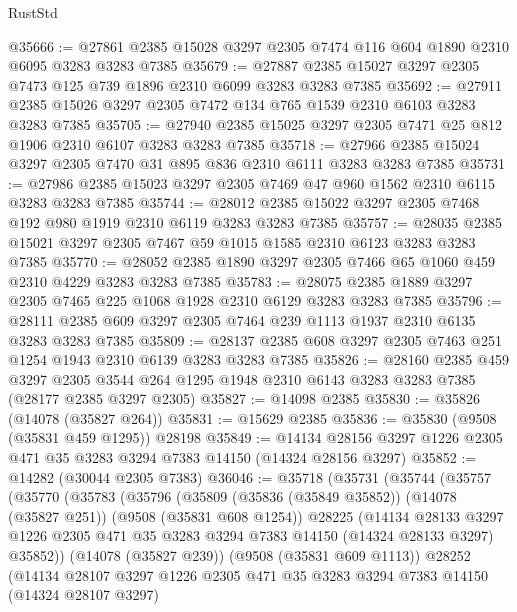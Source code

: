\begin{lexlean}{RustStd}
\begin{coremodule}
@35666 := @27861 @2385 @15028 @3297 @2305 @7474 @116 @604 @1890 @2310 @6095 @3283 @3283 @7385
@35679 := @27887 @2385 @15027 @3297 @2305 @7473 @125 @739 @1896 @2310 @6099 @3283 @3283 @7385
@35692 := @27911 @2385 @15026 @3297 @2305 @7472 @134 @765 @1539 @2310 @6103 @3283 @3283 @7385
@35705 := @27940 @2385 @15025 @3297 @2305 @7471 @25 @812 @1906 @2310 @6107 @3283 @3283 @7385
@35718 := @27966 @2385 @15024 @3297 @2305 @7470 @31 @895 @836 @2310 @6111 @3283 @3283 @7385
@35731 := @27986 @2385 @15023 @3297 @2305 @7469 @47 @960 @1562 @2310 @6115 @3283 @3283 @7385
@35744 := @28012 @2385 @15022 @3297 @2305 @7468 @192 @980 @1919 @2310 @6119 @3283 @3283 @7385
@35757 := @28035 @2385 @15021 @3297 @2305 @7467 @59 @1015 @1585 @2310 @6123 @3283 @3283 @7385
@35770 := @28052 @2385 @1890 @3297 @2305 @7466 @65 @1060 @459 @2310 @4229 @3283 @3283 @7385
@35783 := @28075 @2385 @1889 @3297 @2305 @7465 @225 @1068 @1928 @2310 @6129 @3283 @3283 @7385
@35796 := @28111 @2385 @609 @3297 @2305 @7464 @239 @1113 @1937 @2310 @6135 @3283 @3283 @7385
@35809 := @28137 @2385 @608 @3297 @2305 @7463 @251 @1254 @1943 @2310 @6139 @3283 @3283 @7385
@35826 := @28160
    @2385
    @459
    @3297
    @2305
    @3544
    @264
    @1295
    @1948
    @2310
    @6143
    @3283
    @3283
    @7385
    (@28177 @2385 @3297 @2305)
@35827 := @14098 @2385
@35830 := @35826 (@14078 (@35827 @264))
@35831 := @15629 @2385
@35836 := @35830 (@9508 (@35831 @459 @1295)) @28198
@35849 := @14134 @28156 @3297 @1226 @2305 @471 @35 @3283 @3294 @7383 @14150 (@14324 @28156 @3297)
@35852 := @14282 (@30044 @2305 @7383)
@36046 := @35718
    (@35731
      (@35744
        (@35757
          (@35770
            (@35783
              (@35796
                (@35809
                  (@35836 (@35849 @35852))
                  (@14078 (@35827 @251))
                  (@9508 (@35831 @608 @1254))
                  @28225
                  (@14134
                    @28133
                    @3297
                    @1226
                    @2305
                    @471
                    @35
                    @3283
                    @3294
                    @7383
                    @14150
                    (@14324 @28133 @3297)
                    @35852))
                (@14078 (@35827 @239))
                (@9508 (@35831 @609 @1113))
                @28252
                (@14134
                  @28107
                  @3297
                  @1226
                  @2305
                  @471
                  @35
                  @3283
                  @3294
                  @7383
                  @14150
                  (@14324 @28107 @3297)

\end{coremodule}
\end{lexlean}

